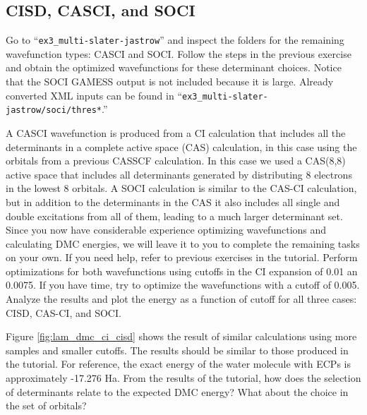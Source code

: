 {%

\subsection{CISD, CASCI, and SOCI}

Go to “\texttt{ex3\_multi-slater-jastrow}” and inspect the folders for the remaining wavefunction types: CASCI and SOCI. Follow the steps in the previous exercise and obtain the optimized wavefunctions for these determinant choices. Notice that the SOCI GAMESS output is not included because it is large. Already converted XML inputs can be found in ``\texttt{ex3\_multi-slater-jastrow/soci/thres*}.'' %

A CASCI wavefunction is produced from a CI calculation that includes all the determinants 
in a complete active space (CAS) calculation, in this case using the orbitals from a previous CASSCF
calculation. In this case we used a CAS(8,8) active space that includes all determinants
generated by distributing 8 electrons in the lowest 8 orbitals. A SOCI calculation is similar
to the CAS-CI calculation, but in addition to the determinants in the CAS it also includes
all single and double excitations from all of them, leading to a much larger determinant
set. Since you now have considerable experience optimizing wavefunctions and calculating
DMC energies, we will leave it to you to complete the remaining tasks on your own.
If you need help, refer to previous exercises in the tutorial. Perform optimizations for both
wavefunctions using cutoffs in the CI expansion of 0.01 an 0.0075. If you have time, try to optimize the wavefunctions with a cutoff of 0.005. Analyze the results and plot
the energy as a function of cutoff for all three cases: CISD, CAS-CI, and SOCI.

Figure  \ref{fig:lam_dmc_ci_cisd} shows the result of similar calculations using more samples and smaller cutoffs.
The results should be similar to those produced in the tutorial. For reference, the exact
energy of the water molecule with ECPs is approximately -17.276 Ha. From the results of the
tutorial, how does the selection of determinants relate to the expected DMC energy?
What about the choice in the set of orbitals?


}
